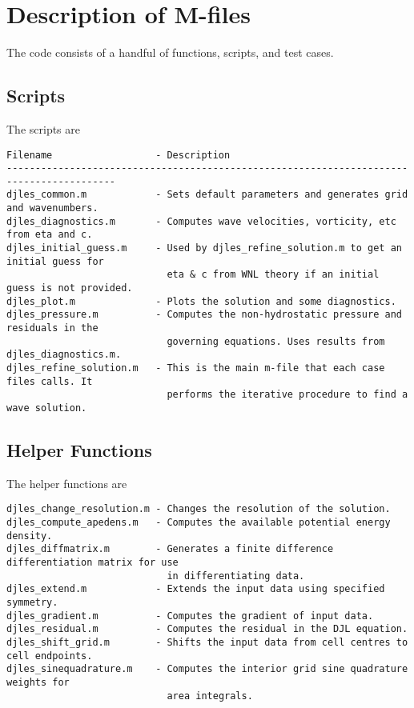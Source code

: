 \documentclass[letterpaper]{article}
\begin{document}
\section{Description of M-files}
The code consists of a handful of functions, scripts, and test cases.

\subsection{Scripts}
The scripts are
\begin{verbatim}
Filename                  - Description
-----------------------------------------------------------------------------------------
djles_common.m            - Sets default parameters and generates grid and wavenumbers.
djles_diagnostics.m       - Computes wave velocities, vorticity, etc from eta and c.
djles_initial_guess.m     - Used by djles_refine_solution.m to get an initial guess for
                            eta & c from WNL theory if an initial guess is not provided.
djles_plot.m              - Plots the solution and some diagnostics.
djles_pressure.m          - Computes the non-hydrostatic pressure and residuals in the
                            governing equations. Uses results from djles_diagnostics.m.
djles_refine_solution.m   - This is the main m-file that each case files calls. It
                            performs the iterative procedure to find a wave solution.
\end{verbatim}

\subsection{Helper Functions}
The helper functions are
\begin{verbatim}
djles_change_resolution.m - Changes the resolution of the solution.
djles_compute_apedens.m   - Computes the available potential energy density.
djles_diffmatrix.m        - Generates a finite difference differentiation matrix for use
                            in differentiating data.
djles_extend.m            - Extends the input data using specified symmetry.
djles_gradient.m          - Computes the gradient of input data.
djles_residual.m          - Computes the residual in the DJL equation.
djles_shift_grid.m        - Shifts the input data from cell centres to cell endpoints.
djles_sinequadrature.m    - Computes the interior grid sine quadrature weights for
                            area integrals.
\end{verbatim}
\end{document}
